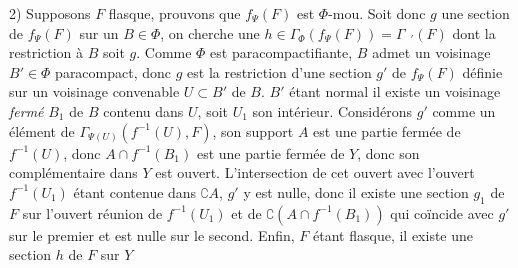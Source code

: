 2) Supposons $F$ flasque, prouvons que $f_\Psi(F)$ est $\Phi$-mou. Soit donc
$g$ une section de $f_\Psi(F)$ sur un $B\in\Phi$, on cherche une
$h\in\Gamma_\Phi(f_\Psi(F))=\Gamma_{\phantom{\Psi}'}(F)$ dont la restriction à $B$
soit $g$. Comme $\Phi$ est paracompactifiante, $B$ admet un voisinage
$B'\in\Phi$ paracompact, donc $g$ est la restriction d'une section $g'$ de
$f_\Psi(F)$ définie sur un voisinage convenable $U\subset B'$ de $B$. $B'$
étant normal il existe un voisinage \textit{fermé} $B_1$ de $B$ contenu dans
$U$, soit $U_1$ son intérieur.
Considérons $g'$ comme un élément de
$\Gamma_{\Psi(U)}(f^{-1}(U),F)$, son support $A$ est une partie fermée de
$f^{-1}(U)$, donc $A\cap f^{-1}(B_1)$ est une partie fermée de $Y$, donc son
complémentaire dans $Y$ est ouvert. L'intersection de cet ouvert avec l'ouvert
$f^{-1}(U_1)$ étant contenue dans $\complement A$, $g'$ y est nulle, donc il
existe une section $g_1$ de $F$ sur l'ouvert réunion de $f^{-1}(U_1)$ et de
$\complement(A\cap f^{-1}(B_1))$ qui coïncide avec $g'$ sur le premier et est
nulle sur le second. Enfin, $F$ étant flasque, il existe une section $h$ de
$F$ sur $Y$

